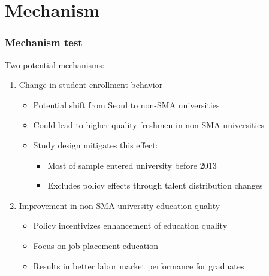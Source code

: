 \documentclass[aspectratio=169,xcolor=dvipsnames,handout]{beamer}
\begin{document}
\section{Mechanism}%
\begin{frame}[allowframebreaks]
    \frametitle{Mechanism test}
    Two potential mechanisms:
    \begin{enumerate}[<+->]
        \item Change in student enrollment behavior
        \begin{itemize}
            \item Potential shift from Seoul to non-SMA universities
            \item Could lead to higher-quality freshmen in non-SMA universities
            \item Study design mitigates this effect:
            \begin{itemize}
            \item Most of sample entered university before 2013
            \item Excludes policy effects through talent distribution changes
            \end{itemize}
        \end{itemize}
        \item Improvement in non-SMA university education quality
        \begin{itemize}
            \item Policy incentivizes enhancement of education quality
            \item Focus on job placement education
            \item Results in better labor market performance for graduates
        \end{itemize}
    \end{enumerate}
\end{frame}
\end{document}
